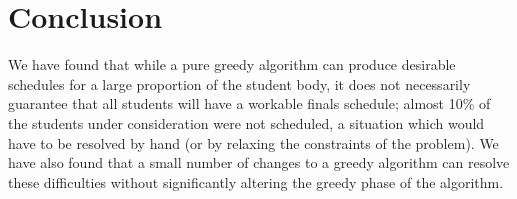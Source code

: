 \documentclass{article}
\begin{document}
\section{Conclusion}

We have found that while a pure greedy algorithm can produce desirable schedules for a large proportion of the student body, it does not necessarily guarantee that all students will have a workable finals schedule; almost 10\% of the students under consideration were not scheduled, a situation which would have to be resolved by hand (or by relaxing the constraints of the problem). We have also found that a small number of changes to a greedy algorithm can resolve these difficulties without significantly altering the greedy phase of the algorithm.
\end{document}
